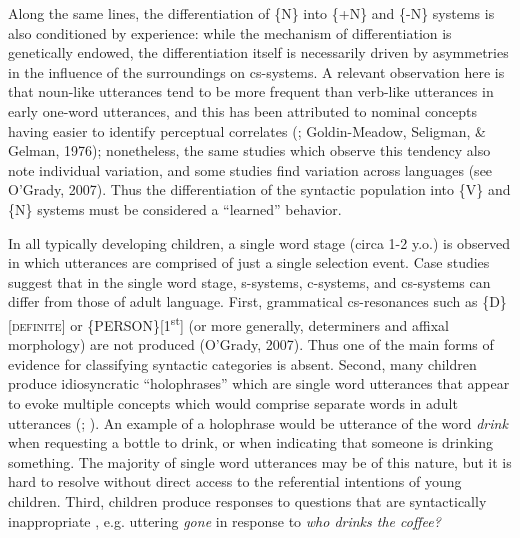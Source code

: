 Along the same lines, the differentiation of \{N\} into \{+N\} and \{-N\} systems is also conditioned by experience: while the mechanism of differentiation is genetically endowed, the differentiation itself is necessarily driven by asymmetries in the influence of the surroundings on cs-systems. A relevant observation here is that noun-like utterances tend to be more frequent than verb-like utterances in early one-word utterances, and this has been attributed to nominal concepts having easier to identify perceptual correlates (\citealt{Gentner1982}; Goldin-Meadow, Seligman, \& Gelman, 1976); nonetheless, the same studies which observe this tendency also note individual variation, and some studies find variation across languages (see O’Grady, 2007). Thus the differentiation of the syntactic population into \{V\} and \{N\} systems must be considered a “learned” behavior.

In all typically developing children, a single word stage (circa 1-2 y.o.) is observed in which utterances are comprised of just a single selection event. Case studies suggest that in the single word stage, s-systems, c-systems, and cs-systems can differ from those of adult language. First, grammatical cs-resonances such as \{D\}[\textsc{definite}] or \{PERSON\}[1\textsuperscript{st}] (or more generally, determiners and affixal morphology) are not produced (O’Grady, 2007). Thus one of the main forms of evidence for classifying syntactic categories is absent. Second, many children produce idiosyncratic “holophrases” which are single word utterances that appear to evoke multiple concepts which would comprise separate words in adult utterances (\citealt{Dore1975}; \citealt{Tomasello2008}). An example of a holophrase would be utterance of the word \textit{drink} when requesting a bottle to drink, or when indicating that someone is drinking something. The majority of single word utterances may be of this nature, but it is hard to resolve without direct access to the referential intentions of young children. Third, children produce responses to questions that are syntactically inappropriate \citep{Radford1990}, e.g. uttering \textit{gone} in response to \textit{who drinks the coffee?} 

